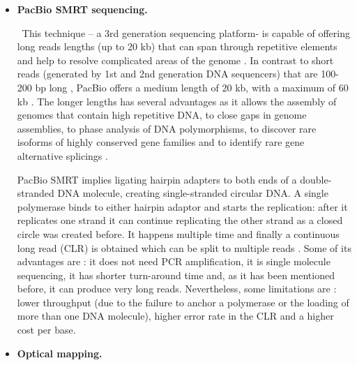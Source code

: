 \documentclass[a4paper,12pt]{article}
\begin{document}
\begin{itemize}
\item {\bf PacBio SMRT sequencing.} 

\
This technique – a 3rd generation sequencing platform- is capable of offering long reads lengths (up to 20  kb) that can span through repetitive elements and help to resolve complicated areas of the genome \cite{chin_phased_2016, jiao_benchmark_2013, rhoads_pacbio_2015}. In contrast to short reads (generated by 1st and 2nd generation DNA sequencers) that are 100-200 bp long \cite{jiao_benchmark_2013}, PacBio offers a medium length of 20 kb, with a maximum of 60 kb \cite{rhoads_pacbio_2015}. The longer lengths has several advantages as it allows the assembly of genomes that contain high repetitive DNA, to close gaps in genome assemblies, to phase analysis of DNA polymorphisms, to discover rare isoforms of highly conserved gene families and to identify rare gene alternative splicings \cite{jiao_benchmark_2013}.
\

PacBio SMRT implies ligating hairpin adapters to both ends of a double-stranded DNA molecule, creating single-stranded circular DNA. A single polymerase binds to either hairpin adaptor and starts the replication: after it replicates one strand it can continue replicating the other strand as a closed circle was created before. It happens multiple time and finally a continuous long read (CLR) is obtained which can be split to multiple reads \cite{rhoads_pacbio_2015}.
Some of its advantages are \cite{jiao_benchmark_2013}: it does not need PCR amplification, it is single molecule sequencing, it has shorter turn-around time and, as it has been mentioned before, it can produce very long reads. Nevertheless, some limitations are \cite{rhoads_pacbio_2015}: lower throughput (due to the failure to anchor a polymerase or the loading of more than one DNA molecule), higher error rate in the CLR and a higher cost per base.

\item {\bf Optical mapping.} 


\end{itemize}
\end{document}
